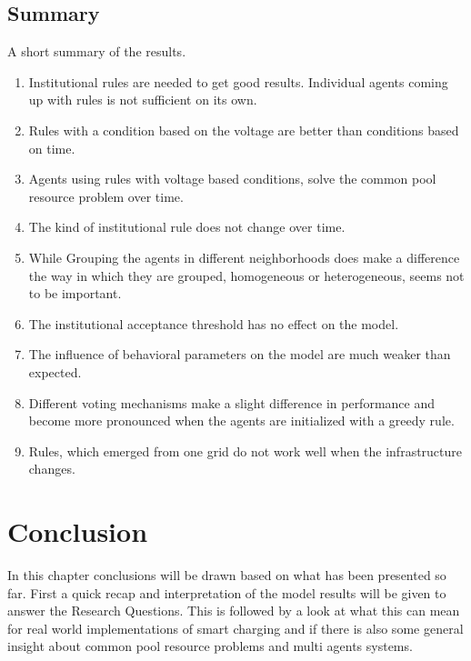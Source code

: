 \documentclass[a4paper]{article}
\begin{document}
\subsection{Summary}
A short summary of the results. 
\begin{enumerate}
 \item Institutional rules are needed to get good results. Individual agents coming up with rules is not 
sufficient on its own.
 \item Rules with a condition based on the voltage are better than conditions based on time. 
 \item Agents using rules with voltage based conditions, solve the common pool resource problem over time.
 \item The kind of institutional rule does not change over time.
 \item While Grouping the agents in different neighborhoods does make a difference the way in which they are grouped, 
homogeneous or heterogeneous, seems not to be important. 
 \item The institutional acceptance threshold has no effect on the model.
 \item The influence of behavioral parameters on the model are much weaker than expected.
 \item Different voting mechanisms make a slight difference in performance and become more pronounced when the agents are initialized with a greedy rule.
 \item Rules, which emerged from one grid do not work well when the infrastructure changes.
\end{enumerate}

\clearpage

\section{Conclusion}
In this chapter conclusions will be drawn based on what has been presented so far. First a quick recap and interpretation of the
model results will be given to answer the Research Questions. 
This is followed by a look at what this can mean for real world implementations of smart charging and if there is also some 
general insight about common pool resource problems and multi agents systems. 
\end{document}
